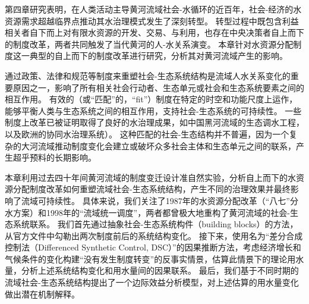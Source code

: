 第四章研究表明，在人类活动主导黄河流域社会-水循环的近百年，社会-经济的水资源需求超越临界点推动其水治理模式发生了深刻转型。
转型过程中既包含利益相关者自下而上对有限水资源的开发、交易、与利用，也存在中央决策者自上而下的制度改革，两者共同触发了当代黄河的人-水关系演变。
本章针对水资源分配制度这一典型的自上而下的制度改革进行研究，分析其对黄河流域产生的影响。

通过政策、法律和规范等制度来重塑社会-生态系统结构是流域人水关系变化的重要原因之一，影响了所有相关社会行动者、生态单元或社会和生态系统要素之间的相互作用\cite{lien2020, bodin2017b}。
有效的（或“匹配”的，``fit''）制度在特定的时空和功能尺度上运作，能够平衡人类与生态系统之间的相互作用，支持社会-生态系统的可持续性\cite{epstein2015, wang2019d}。
一些制度上改革已被证明取得了良好的水治理成果，如中国黑河流域的生态调水工程\cite{wang2019d}，以及欧洲的协同水治理系统\cite{green2013}）。
这种匹配的社会-生态结构并不普遍，因为一个复杂的大河流域推动制度变化会建立或破坏众多社会主体和生态单元之间的联系，产生超乎预料的长期影响。


本章利用过去四十年间黄河流域的制度变迁设计准自然实验，分析自上而下的水资源分配制度改革如何重塑流域社会-生态系统结构，产生不同的治理效果并最终影响了流域可持续性。
具体来说，我们关注了1987年的水资源分配改革（“八七”分水方案）和1998年的“流域统一调度”，两者都曾极大地重构了黄河流域的社会-生态系统联系。
我们首先通过抽象社会-生态系统构件（building blocks）的方法，从官方文件中勾勒出两次制度前后的系统结构变化。
接下来，使用名为“差分合成控制法（Differenced Synthetic Control, DSC）”的因果推断方法\cite{arkhangelsky2021}，考虑经济增长和气候条件的变化构建“没有发生制度转变”的反事实情景，估算此情景下的理论用水量，分析上述系统结构变化和用水量间的因果联系。
最后，我们基于不同时期的流域社会-生态系统结构提出了一个边际效益分析模型，对上述估算的用水量变化做出潜在机制解释。
